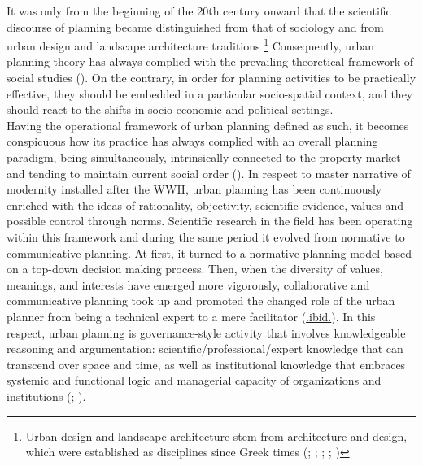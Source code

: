 \documentclass[11pt]{report}
\begin{document}
It was only from the beginning of the 20th century onward that the scientific discourse of planning became distinguished from that of sociology and from urban design and landscape architecture traditions
\footnote{Urban design and landscape architecture stem from architecture and design, which were established as disciplines since Greek times
(\href{Handlin}{\citealt{Handlin and Burchard, 1966}};
\href{Allmedinger}{\citealt{Allmendinger, 2002}};
\href{Hall}{\citealt{hall_cities_2002}};
\href{Platt}{\citealt{Platt, 2003}};
\href{Van}{\citealt{van_assche_co-evolutions_2013}})} 
Consequently, urban planning theory has always complied with the prevailing theoretical framework of social studies (\href{Portugali}{\citealt{Portugali 2011}}).
On the contrary, in order for planning activities to be practically effective, they should be embedded in a particular socio-spatial context, and they should react to the shifts in socio-economic and political settings.
\\

Having the operational framework of urban planning defined as such, it becomes conspicuous how its practice has always complied with an overall planning paradigm, being simultaneously, intrinsically  connected to the property  market and tending to maintain current social order (\href{Taylor}{\citealt{taylor_urban_2006}}). 
In respect to master narrative of modernity installed after the WWII, urban planning has been continuously enriched with the ideas of rationality, objectivity, scientific evidence, values and possible control through norms. 
Scientific  research  in  the  field has been operating  within  this  framework  and  during  the  same  period it evolved from normative to communicative planning.
At first, it turned to a  normative planning model based on a top-down decision making process.
Then, when the diversity of values, meanings, and interests have emerged more vigorously, collaborative and communicative planning took up and promoted the changed role of the urban planner from being a technical expert to a mere facilitator (\href{Taylor}{.ibid.}).
In this respect, urban planning is governance-style activity that involves knowledgeable reasoning and argumentation: scientific/professional/expert knowledge that can transcend over space and time, as well as institutional knowledge that embraces systemic and functional logic and managerial capacity of organizations and institutions (\href{Healey}{\citealt{healey_collaborative_1997}}; \href{Getimis}{\citealt{getimis_comparing_2012}}).
\\ 
\end{document}
